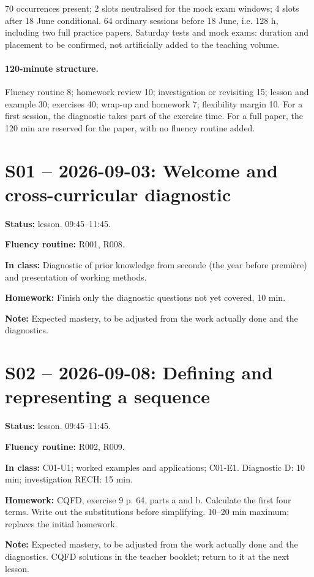\label{ANNUEL}
70 occurrences present; 2 slots neutralised for the mock exam windows; 4 slots after 18 June conditional. 64 ordinary sessions before 18 June, i.e. 128 h, including two full practice papers. Saturday tests and mock exams: duration and placement to be confirmed, not artificially added to the teaching volume.
\paragraph{120-minute structure.} Fluency routine 8; homework review 10; investigation or revisiting 15; lesson and example 30; exercises 40; wrap-up and homework 7; flexibility margin 10. For a first session, the diagnostic takes part of the exercise time. For a full paper, the 120 min are reserved for the paper, with no fluency routine added.
\section*{S01 -- 2026-09-03: Welcome and cross-curricular diagnostic}
\textbf{Status:} lesson. 09:45–11:45.\par\textbf{Fluency routine:} R001, R008.\par\textbf{In class:} Diagnostic of prior knowledge from seconde (the year before première) and presentation of working methods.\par\textbf{Homework:} Finish only the diagnostic questions not yet covered, 10 min.\par\textbf{Note:} Expected mastery, to be adjusted from the work actually done and the diagnostics.
\section*{S02 -- 2026-09-08: Defining and representing a sequence}
\textbf{Status:} lesson. 09:45–11:45.\par\textbf{Fluency routine:} R002, R009.\par\textbf{In class:} C01-U1; worked examples and applications; C01-E1. Diagnostic D: 10 min; investigation RECH: 15 min.\par\textbf{Homework:} CQFD, exercise 9 p. 64, parts a and b. Calculate the first four terms. Write out the substitutions before simplifying. 10–20 min maximum; replaces the initial homework.\par\textbf{Note:} Expected mastery, to be adjusted from the work actually done and the diagnostics. CQFD solutions in the teacher booklet; return to it at the next lesson.
